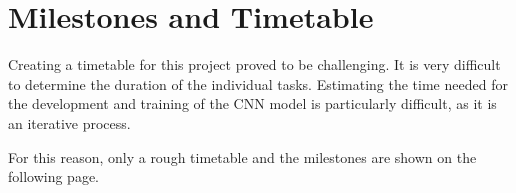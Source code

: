 \chapter{Milestones and Timetable}
\label{ch:milestones_and_timetable}

Creating a timetable for this project proved to be challenging.
It is very difficult to determine the duration of the individual tasks.
Estimating the time needed for the development and training of the CNN model is particularly difficult, as it is an iterative process.

For this reason, only a rough timetable and the milestones are shown on the following page.


